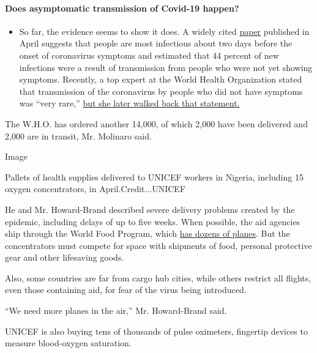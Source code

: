 \begin{itemize}
{  \paragraph{Does asymptomatic transmission of Covid-19
  happen?}\label{does-asymptomatic-transmission-of-covid-19-happen}}

  \begin{itemize}
  \tightlist
  \item
    So far, the evidence seems to show it does. A widely cited
    \href{https://www.nature.com/articles/s41591-020-0869-5}{paper}
    published in April suggests that people are most infectious about
    two days before the onset of coronavirus symptoms and estimated that
    44 percent of new infections were a result of transmission from
    people who were not yet showing symptoms. Recently, a top expert at
    the World Health Organization stated that transmission of the
    coronavirus by people who did not have symptoms was ``very rare,''
    \href{https://www.nytimes3xbfgragh.onion/2020/06/09/world/coronavirus-updates.html?action=click\&pgtype=Article\&state=default\&region=MAIN_CONTENT_3\&context=storylines_faq\#link-1f302e21}{but
    she later walked back that statement.}
  \end{itemize}
\end{itemize}

The W.H.O. has ordered another 14,000, of which 2,000 have been
delivered and 2,000 are in transit, Mr. Molinaro said.

Image

Pallets of health supplies delivered to UNICEF workers in Nigeria,
including 15 oxygen concentrators, in April.Credit...UNICEF

He and Mr. Howard-Brand described severe delivery problems created by
the epidemic, including delays of up to five weeks. When possible, the
aid agencies ship through the World Food Program, which
\href{https://www.wfp.org/publications/wfp-aviation-2018}{has dozens of
planes}. But the concentrators must compete for space with shipments of
food, personal protective gear and other lifesaving goods.

Also, some countries are far from cargo hub cities, while others
restrict all flights, even those containing aid, for fear of the virus
being introduced.

``We need more planes in the air,'' Mr. Howard-Brand said.

UNICEF is also buying tens of thousands of pulse oximeters, fingertip
devices to measure blood-oxygen saturation.

